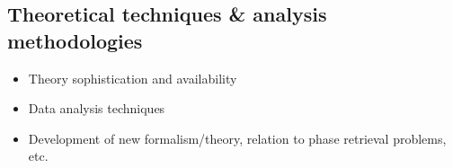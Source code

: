 \subsection{Theoretical techniques \& analysis methodologies}

\begin{itemize}
\item Theory sophistication and availability
\item Data analysis techniques
\item Development of new formalism/theory, relation to phase retrieval problems, etc.
\end{itemize}